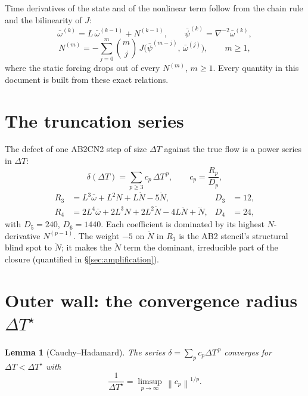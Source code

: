 \documentclass[11pt]{article}
\newtheorem{lemma}{Lemma}
\theoremstyle{remark}
\newcommand{\wbar}{\bar{\omega}}
\newcommand{\pbar}{\bar{\psi}}
\newcommand{\DT}{\Delta T}
\newcommand{\DTs}{\Delta T^{\star}}
\newcommand{\norm}[1]{\left\lVert #1 \right\rVert}
\begin{document}
Time derivatives of the state and of the nonlinear term follow from the
chain rule and the bilinearity of $J$:
\begin{equation}\label{eq:recursion}
\wbar^{(k)} = L\,\wbar^{(k-1)} + N^{(k-1)}, \qquad
\pbar^{(k)} = \nabla^{-2}\wbar^{(k)},
\end{equation}
\begin{equation}\label{eq:binomial}
N^{(m)} = -\sum_{j=0}^{m}\binom{m}{j}\,
J\!\bigl(\pbar^{(m-j)},\,\wbar^{(j)}\bigr), \qquad m \ge 1,
\end{equation}
where the static forcing drops out of every $N^{(m)}$, $m\ge1$. Every
quantity in this document is built from these exact relations.

\section{The truncation series}\label{sec:series}

The defect of one AB2CN2 step of size $\DT$ against the true flow is a power
series in $\DT$:
\begin{equation}\label{eq:defect}
\delta(\DT) = \sum_{p\ge3} c_p\,\DT^{\,p}, \qquad c_p = \frac{R_p}{D_p},
\end{equation}
\begin{align}
R_3 &= L^3\wbar + L^2 N + L\dot N - 5\ddot N, & D_3 &= 12,\\
R_4 &= 2L^4\wbar + 2L^3 N + 2L^2\dot N - 4L\ddot N + \dddot N, & D_4 &= 24,
\end{align}
with $D_5 = 240$, $D_6 = 1440$. Each coefficient is dominated by its highest
$N$-derivative $N^{(p-1)}$. The weight $-5$ on $\ddot N$ in $R_3$ is the AB2
stencil's structural blind spot to $\ddot N$; it makes the $\ddot N$ term the
dominant, irreducible part of the closure (quantified in
\S\ref{sec:amplification}).

\section{Outer wall: the convergence radius $\DTs$}\label{sec:outer}

\begin{lemma}[Cauchy--Hadamard]\label{lem:ch}
The series $\delta = \sum_p c_p \DT^{\,p}$ converges for $\DT < \DTs$ with
\begin{equation}
\frac{1}{\DTs} = \limsup_{p\to\infty}\,\norm{c_p}^{1/p}.
\end{equation}
\end{lemma}
\end{document}
